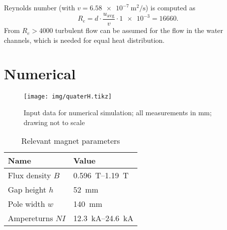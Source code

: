 \documentclass[10pt,a4paper,noendnumber=true]{scrartcl}
\begin{document}
Reynolds number (with $v=\SI{6.58e-7}{\meter\squared\per\second}$) is computed as
\begin{equation}
    R_e = d \cdot \frac{u_\text{avg}}{v} \cdot \num{1e-3} = \num{16660}.
\end{equation}
From $R_e>4000$ turbulent flow can be assumed for the flow in the water channels, which is needed for equal heat distribution.



\newpage
\section{Numerical}

\begin{figure}[H]
\centering
\texttt{[image: img/quaterH.tikz]}
\caption{Input data for numerical simulation; all measurements in \si{\mm}; drawing not to scale}
\end{figure}

\begin{table}[H]
\centering
\caption{Relevant magnet parameters}
\begin{tabular}{ll}
\toprule
Name & Value \\
\midrule
Flux density $B$ & \SIrange{0.596}{1.19}{\tesla}\\
Gap height $h$ & \SI{52}{\mm}\\
Pole width $w$ & \SI{140}{\mm}\\
Ampereturns $NI$ & \SIrange{12.3}{24.6}{\kilo\ampere}\\
\bottomrule
\end{tabular}
\end{table}
\end{document}
